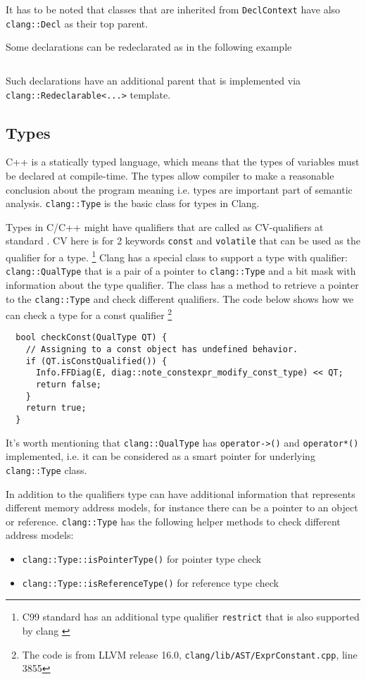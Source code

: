 It has to be noted that classes that are inherited from
\texttt{DeclContext} have also \texttt{clang::Decl} as their
top parent.

Some declarations can be redeclarated as in the following example
\inputminted{c++}{./src/part1/ch2_arch/redeclaration.cpp}
Such declarations have an additional parent that is implemented via
\texttt{clang::Redeclarable<...>} template.

\subsection{Types}
C++ is a statically typed language, which means that the types of
variables must be declared at compile-time. The types allow compiler to make a
reasonable conclusion about the program meaning i.e. types are important part of
semantic analysis. \texttt{clang::Type} is the basic class for types in
Clang.

Types in C/C++ might have qualifiers that are called as CV-qualifiers at
standard \citep[basic.type.qualifier]{standard:cpp20}. CV here is for 2 keywords
\texttt{const} and \texttt{volatile} that can be used as the
qualifier for a type.
\footnote{
C99 standard has an additional type qualifier \texttt{restrict} that is
also supported by clang \citep[6.7.3]{standard:c99} 
}
Clang has a special class to support a type with qualifier:
\texttt{clang::QualType} that is a pair of a pointer to
\texttt{clang::Type} and a bit mask with information about the type
qualifier. The class has a method to retrieve a pointer to the
\texttt{clang::Type} and check different qualifiers. The code below
shows how we can check a type for a const qualifier
\footnote{The code is from LLVM release 16.0,
\texttt{clang/lib/AST/ExprConstant.cpp}, line 3855} 
\begin{verbatim}
  bool checkConst(QualType QT) {
    // Assigning to a const object has undefined behavior.
    if (QT.isConstQualified()) {
      Info.FFDiag(E, diag::note_constexpr_modify_const_type) << QT;
      return false;
    }
    return true;
  }
\end{verbatim}
It's worth mentioning that \texttt{clang::QualType} has
\texttt{operator->()} and \texttt{operator*()} implemented,
i.e. it can be considered as a smart pointer for underlying
\texttt{clang::Type} class.

In addition to the qualifiers type can have additional information that
represents different memory address models, for instance there can be a
pointer to an object or
reference. \texttt{clang::Type}
has the following helper methods to check different address models:
\begin{itemize}
\item \texttt{clang::Type::isPointerType()} for pointer type check
\item \texttt{clang::Type::isReferenceType()} for reference type check
\end{itemize}

